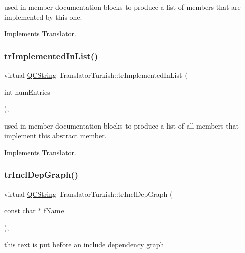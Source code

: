 used in member documentation blocks to produce a list of members that are implemented by this one. 

Implements \mbox{\hyperlink{class_translator}{Translator}}.

\mbox{\label{class_translator_turkish_a5a8cdb426ecf926732c5efa692341140}} 
\subsubsection{\texorpdfstring{trImplementedInList()}{trImplementedInList()}}
{\footnotesize\ttfamily virtual \mbox{\hyperlink{class_q_c_string}{Q\+C\+String}} Translator\+Turkish\+::tr\+Implemented\+In\+List (\begin{DoxyParamCaption}\item[{int}]{num\+Entries }\end{DoxyParamCaption})\hspace{0.3cm}{\ttfamily [inline]}, {\ttfamily [virtual]}}

used in member documentation blocks to produce a list of all members that implement this abstract member. 

Implements \mbox{\hyperlink{class_translator}{Translator}}.

\mbox{\label{class_translator_turkish_aba3b2f5056ad6e778cac4cfb9280e109}} 
\subsubsection{\texorpdfstring{trInclDepGraph()}{trInclDepGraph()}}
{\footnotesize\ttfamily virtual \mbox{\hyperlink{class_q_c_string}{Q\+C\+String}} Translator\+Turkish\+::tr\+Incl\+Dep\+Graph (\begin{DoxyParamCaption}\item[{const char $\ast$}]{f\+Name }\end{DoxyParamCaption})\hspace{0.3cm}{\ttfamily [inline]}, {\ttfamily [virtual]}}

this text is put before an include dependency graph 

